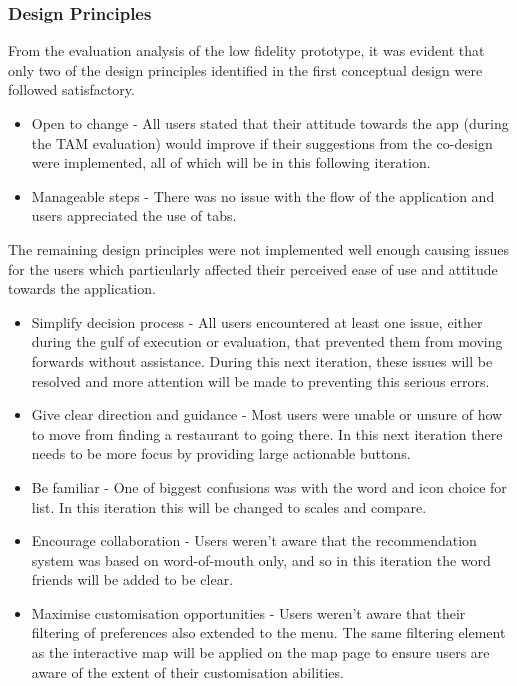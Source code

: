 \documentclass[a4 paper, 12pt]{article}
\begin{document}
    \subsubsection{Design Principles}
    From the evaluation analysis of the low fidelity prototype, it was evident that only two of the design principles identified in the first conceptual design were followed satisfactory.   
    \begin{itemize}
        \item Open to change - All users stated that their attitude towards the app (during the TAM evaluation) would improve if their suggestions from the co-design were implemented, all of which will be in this following iteration.  
        \item Manageable steps - There was no issue with the flow of the application and users appreciated the use of tabs.
    \end{itemize}
    
    The remaining design principles were not implemented well enough causing issues for the users which particularly affected their perceived ease of use and attitude towards the application.
        \begin{itemize}
            \item Simplify decision process - All users encountered at least one issue, either during the gulf of execution or evaluation, that prevented them from moving forwards without assistance. During this next iteration, these issues will be resolved and more attention will be made to preventing this serious errors.
            \item Give clear direction and guidance - Most users were unable or unsure of how to move from finding a restaurant to going there. In this next iteration there needs to be more focus by providing large actionable buttons.
            \item Be familiar - One of biggest confusions was with the word and icon choice for list. In this iteration this will be changed to scales and compare. 
            \item Encourage collaboration - Users weren't aware that the recommendation system was based on word-of-mouth only, and so in this iteration the word friends will be added to be clear.
            \item Maximise customisation opportunities - Users weren't aware that their filtering of preferences also extended to the menu. The same filtering element as the interactive map will be applied on the map page to ensure users are aware of the extent of their customisation abilities.
        \end{itemize}
\end{document}
